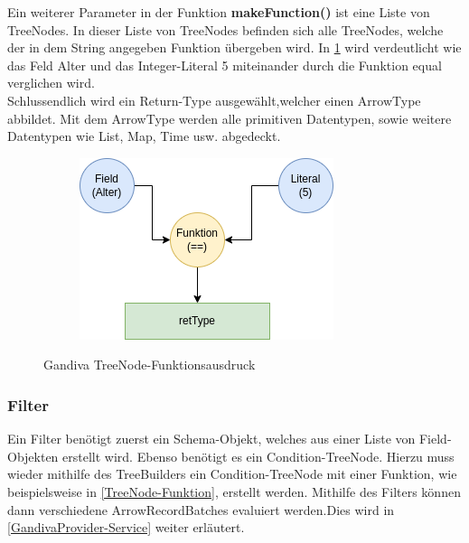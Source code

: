 Ein weiterer Parameter in der Funktion \textbf{makeFunction()} ist eine Liste von TreeNodes.
In dieser Liste von TreeNodes befinden sich alle TreeNodes, welche der in dem String angegeben Funktion übergeben wird.
In \ref{graf_5} wird verdeutlicht wie das Feld \glqq{}Alter\grqq{} und das Integer-Literal \glqq{}5\grqq{} miteinander durch die Funktion \glqq{}equal\grqq{} verglichen wird. \\
Schlussendlich wird ein Return-Type ausgewählt,welcher einen ArrowType abbildet. Mit dem ArrowType werden alle primitiven Datentypen, sowie weitere Datentypen wie \glqq{}List, Map, Time\grqq{} usw. abgedeckt.

\begin{figure}[h]
  \centering
  \begin{subfigure}[b]{0.5\textwidth}
    \includegraphics[width=1.0\linewidth]{img/gandiva_funktion}
  \end{subfigure}
  \caption{Gandiva TreeNode-Funktionsausdruck}
  \label{graf_5}
\end{figure}

\subsubsection{Filter}

Ein Filter benötigt zuerst ein Schema-Objekt, welches aus einer Liste von Field-Objekten erstellt wird. Ebenso benötigt es ein Condition-TreeNode.
Hierzu muss wieder mithilfe des TreeBuilders ein Condition-TreeNode mit einer Funktion, wie beispielsweise in \ref{TreeNode-Funktion}, erstellt werden.
Mithilfe des Filters können dann verschiedene ArrowRecordBatches evaluiert werden.Dies wird in \ref{GandivaProvider-Service} weiter erläutert.

